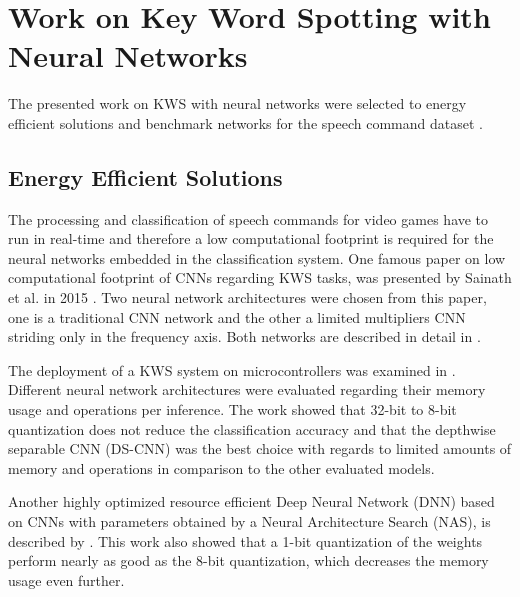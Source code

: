 
\section{Work on Key Word Spotting with Neural Networks}\label{sec:prev_kws}
The presented work on KWS with neural networks were selected to energy efficient solutions and benchmark networks for the speech command dataset \cite{Warden2018}.



\subsection{Energy Efficient Solutions}
The processing and classification of speech commands for video games have to run in real-time and therefore a low computational footprint is required for the neural networks embedded in the classification system.
One famous paper on low computational footprint of CNNs regarding KWS tasks, was presented by Sainath et al. in 2015 \cite{Sainath2015}.
Two neural network architectures were chosen from this paper, one is a traditional CNN network and the other a limited multipliers CNN striding only in the frequency axis.
Both networks are described in detail in .

The deployment of a KWS system on microcontrollers was examined in \cite{Zhang2017}.
Different neural network architectures were evaluated regarding their memory usage and operations per inference.
The work showed that 32-bit to 8-bit quantization does not reduce the classification accuracy and that the depthwise separable CNN (DS-CNN) was the best choice with regards to limited amounts of memory and operations in comparison to the other evaluated models.

Another highly optimized resource efficient Deep Neural Network (DNN) based on CNNs with parameters obtained by a Neural Architecture Search (NAS), is described by \cite{Peter2020}.
This work also showed that a 1-bit quantization of the weights perform nearly as good as the 8-bit quantization, which decreases the memory usage even further.



